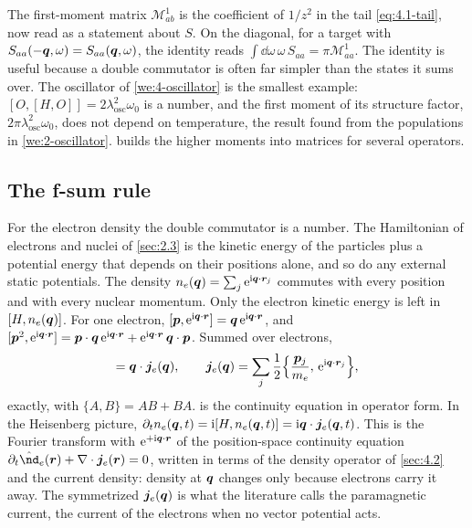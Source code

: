 The first-moment matrix $\mathscr{M}^1_{ab}$ is the coefficient of $1/z^2$ in the tail \cref{eq:4.1-tail}, now read as a statement about $S$. On the diagonal, for a target with $S_{aa}(-\bm{q},\omega) = S_{aa}(\bm{q},\omega)$, the identity reads $\int\dd\omega\,\omega\,S_{aa} = \pi\mathscr{M}^1_{aa}$. The identity is useful because a double commutator is often far simpler than the states it sums over. The oscillator of \cref{we:4-oscillator} is the smallest example: $[O, [H, O]] = 2\lambda_{\mathrm{osc}}^2\omega_0$ is a number, and the first moment of its structure factor, $2\pi\lambda_{\mathrm{osc}}^2\omega_0$, does not depend on temperature, the result found from the populations in \cref{we:2-oscillator}.  builds the higher moments into matrices for several operators.

\subsection{The f-sum rule}

For the electron density the double commutator is a number. The Hamiltonian of electrons and nuclei of \cref{sec:2.3} is the kinetic energy of the particles plus a potential energy that depends on their positions alone, and so do any external static potentials. The density $n_e(\bm{q}) = \sum_j\mathrm{e}^{\mathrm{i}\bm{q}\cdot\bm{r}_j}$ commutes with every position and with every nuclear momentum. Only the electron kinetic energy is left in $[H, n_e(\bm{q})]$. For one electron, $[\bm{p}, \mathrm{e}^{\mathrm{i}\bm{q}\cdot\bm{r}}] = \bm{q}\,\mathrm{e}^{\mathrm{i}\bm{q}\cdot\bm{r}}$, and $[\bm{p}^2, \mathrm{e}^{\mathrm{i}\bm{q}\cdot\bm{r}}] = \bm{p}\cdot\bm{q}\,\mathrm{e}^{\mathrm{i}\bm{q}\cdot\bm{r}} + \mathrm{e}^{\mathrm{i}\bm{q}\cdot\bm{r}}\,\bm{q}\cdot\bm{p}$. Summed over electrons,
\begin{equation}
  [H, n_e(\vect{q})] = \vect{q}\cdot\vect{j}_e(\vect{q}), \qquad \vect{j}_e(\vect{q}) = \sum_j\frac12\Bigl\{\frac{\vect{p}_j}{m_e},\,\ee^{\ii\vect{q}\cdot\vect{r}_j}\Bigr\} ,
  \label{eq:4.3-continuity}
\end{equation}
exactly, with $\{A, B\} = AB + BA$.  is the continuity equation in operator form. In the Heisenberg picture, $\partial_tn_e(\bm{q},t) = \mathrm{i}[H, n_e(\bm{q},t)] = \mathrm{i}\bm{q}\cdot\bm{j}_e(\bm{q},t)$. This is the Fourier transform with $\mathrm{e}^{+\mathrm{i}\bm{q}\cdot\bm{r}}$ of the position-space continuity equation $\partial_t\op{\nd}_e(\vect{r}) + \nabla\cdot\vect{j}_e(\vect{r}) = 0$, written in terms of the density operator of \cref{sec:4.2} and the current density: density at $\bm{q}$ changes only because electrons carry it away. The symmetrized $\bm{j}_e(\bm{q})$ is what the literature calls the paramagnetic current, the current of the electrons when no vector potential acts.

